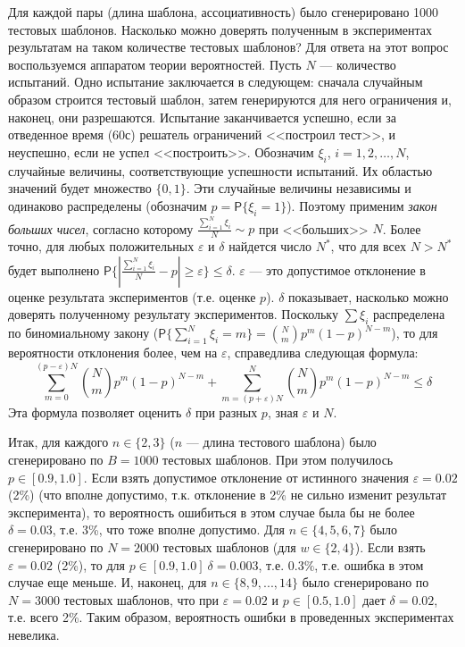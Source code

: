 Для каждой пары (длина шаблона, ассоциативность) было сгенерировано 1000
тестовых шаблонов. Насколько можно доверять полученным в экспериментах
результатам на таком количестве тестовых шаблонов? Для ответа на этот вопрос воспользуемся аппаратом теории
вероятностей. Пусть $N$ --- количество испытаний. Одно испытание заключается в
следующем: сначала случайным образом строится тестовый шаблон, затем генерируются
для него ограничения и, наконец, они разрешаются. Испытание заканчивается успешно, если за отведенное время (60с) решатель ограничений <<построил тест>>, и неуспешно, если не успел <<построить>>.
Обозначим  $\xi_i$, $i = 1, 2, \dots, N$, случайные величины, соответствующие
успешности испытаний. Их областью значений будет множество $\{0, 1\}$. Эти
случайные величины независимы и одинаково распределены (обозначим $p =
\mathsf{P}\{\xi_i = 1\}$). Поэтому применим \emph{закон больших чисел}, согласно
которому $\frac{\sum_{i=1}^N \xi_i}{N} \sim p$ при <<больших>> $N$. Более точно, для любых
положительных $\varepsilon$ и $\delta$ найдется число $N^*$, что для всех $N > N^*$ будет
выполнено $\mathsf{P}\{|\frac{\sum_{i=1}^N \xi_i}{N} - p | \geq \varepsilon\} \leq \delta$. $\varepsilon$ --- это допустимое отклонение в оценке результата экспериментов (т.е. оценке $p$). $\delta$ показывает, насколько можно доверять полученному результату экспериментов. Поскольку $\sum \xi_i$ распределена по биномиальному закону ($\mathsf{P}\{\sum_{i=1}^N \xi_i = m\} = \binom{N}{m} p^m (1{-}p)^{N{-}m}$), то для вероятности отклонения более, чем на $\varepsilon$, справедлива следующая формула: $$\sum_{m = 0}^{(p-\varepsilon)N} \binom{N}{m} p^m (1{-}p)^{N{-}m} + \sum_{m = (p+\varepsilon)N}^N \binom{N}{m} p^m (1{-}p)^{N{-}m} \leq \delta$$ Эта формула позволяет оценить $\delta$ при разных $p$, зная $\varepsilon$ и $N$.

Итак, для каждого $n \in \{2,3\}$ ($n$ --- длина тестового шаблона) было сгенерировано по $B = 1000$ тестовых шаблонов. При этом получилось $p \in [0.9, 1.0]$. Если взять допустимое отклонение от истинного значения $\varepsilon = 0.02$ (2\%) (что вполне допустимо, т.к. отклонение в 2\% не сильно изменит результат эксперимента), то вероятность ошибиться в этом случае была бы не более $\delta = 0.03$, т.е. 3\%, что тоже вполне допустимо. Для $n \in \{4, 5, 6, 7\}$ было сгенерировано по $N = 2000$ тестовых шаблонов (для $w \in \{2,4\}$). Если взять $\varepsilon = 0.02$ (2\%), то для $p \in [0.9, 1.0] ~ \delta{=}0.003$, т.е. $0.3\%$, т.е. ошибка в этом случае еще меньше. И, наконец, для $n \in \{8, 9, ..., 14\}$ было сгенерировано по $N = 3000$ тестовых шаблонов, что при $\varepsilon = 0.02$ и $p \in [0.5, 1.0]$ дает $\delta = 0.02$, т.е. всего 2\%. Таким образом, вероятность ошибки в проведенных экспериментах невелика.

